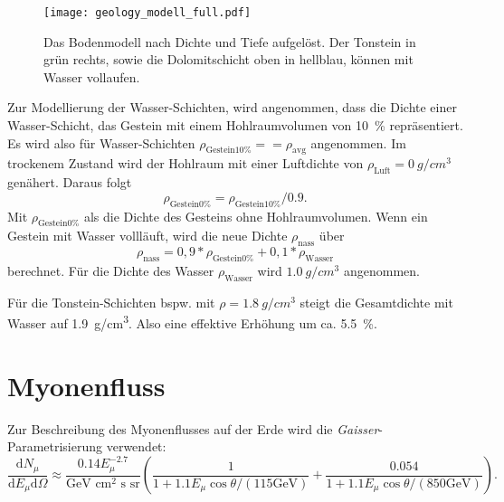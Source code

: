 \begin{figure}[h]
    \centering
    \texttt{[image: geology\_modell\_full.pdf]}
    \caption{Das Bodenmodell nach Dichte und Tiefe aufgelöst.
    Der Tonstein in grün rechts, 
    sowie die Dolomitschicht oben in hellblau, können mit Wasser vollaufen.}
    \label{fig:dichte_modell}
\end{figure}

Zur Modellierung der Wasser-Schichten,
wird angenommen, dass die Dichte 
einer Wasser-Schicht, das Gestein mit einem
Hohlraumvolumen von \SI[]{10}[]{\%} repräsentiert. 
Es wird also für Wasser-Schichten $\rho_\mathrm{Gestein10\%} == \rho_\mathrm{avg}$ angenommen.
Im trockenem Zustand wird der Hohlraum mit einer Luftdichte von 
$\rho_\mathrm{Luft} = \SI[]{0}[]{g/cm^3}$ genähert.
Daraus folgt 
\begin{equation}
    \rho_\mathrm{Gestein0\%} = \rho_\mathrm{Gestein10\%} / \num[]{0,9}.
\end{equation}
Mit $\rho_\mathrm{Gestein0\%}$ als die Dichte des Gesteins ohne Hohlraumvolumen.
Wenn ein Gestein mit Wasser vollläuft, wird die neue Dichte $\rho_\mathrm{nass}$ über
\begin{equation}
    \rho_\mathrm{nass} = 0,9*\rho_\mathrm{Gestein0\%} + 0,1*\rho_\mathrm{Wasser}
\end{equation}
berechnet. Für die Dichte des Wasser $\rho_\mathrm{Wasser}$ wird 
$\SI[]{1.0}[]{g/cm^3}$ \cite{Patterson_1994} angenommen.

Für die Tonstein-Schichten bspw. mit $\rho = \SI[]{1,8}[]{g/cm^3}$ 
steigt die Gesamtdichte mit Wasser auf \SI[]{1,9}[]{g/cm^3}.
Also eine effektive Erhöhung um ca. \SI[]{5,5}[]{\%}.



\section{Myonenfluss}
\label{sec:myonenfluss}

Zur Beschreibung des Myonenflusses auf der Erde wird die 
\textit{Gaisser}-Parametrisierung \cite{Alexandrov2017} verwendet:
\begin{equation}
        \frac{\mathrm{d}N_{\mu}}{\mathrm{d}E_{\mu}\mathrm{d}\Omega} \approx \frac{0.14 E_{\mu}^{-2.7}}{\text{GeV cm$^2$ s sr}} \left(\frac{1}{1+1.1 E_{\mu}\cos \theta / (115 \text{GeV})} 
        + \frac{0.054}{1+1.1 E_{\mu}\cos \theta / (850 \text{GeV})}\right).
    \label{eqn:dN_dE}
\end{equation}

